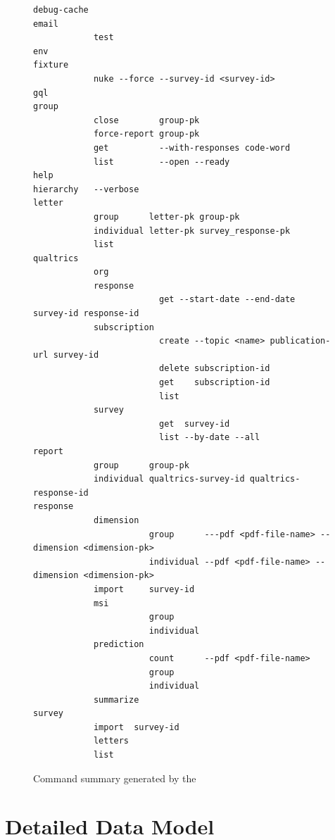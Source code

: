 \documentclass{article}
\begin{document}

\begin{figure}
  \centering
\begin{Verbatim}[fontsize=\tiny,frame=single]
debug-cache
email
            test
env
fixture
            nuke --force --survey-id <survey-id>
gql
group
            close        group-pk
            force-report group-pk
            get          --with-responses code-word
            list         --open --ready
help
hierarchy   --verbose
letter
            group      letter-pk group-pk
            individual letter-pk survey_response-pk
            list
qualtrics
            org
            response
                         get --start-date --end-date survey-id response-id
            subscription
                         create --topic <name> publication-url survey-id
                         delete subscription-id
                         get    subscription-id
                         list
            survey
                         get  survey-id
                         list --by-date --all
report
            group      group-pk
            individual qualtrics-survey-id qualtrics-response-id
response
            dimension
                       group      ---pdf <pdf-file-name> --dimension <dimension-pk>
                       individual --pdf <pdf-file-name> --dimension <dimension-pk>
            import     survey-id
            msi
                       group
                       individual
            prediction
                       count      --pdf <pdf-file-name>
                       group
                       individual
            summarize
survey
            import  survey-id
            letters
            list
\end{Verbatim}
  \caption{Command summary generated by the \caper{} \cli}
  \label{fig:cli-commands}
\end{figure}

\appendix

\section{Detailed Data Model}
\label{sec:detailed-data-model}
\end{document}
